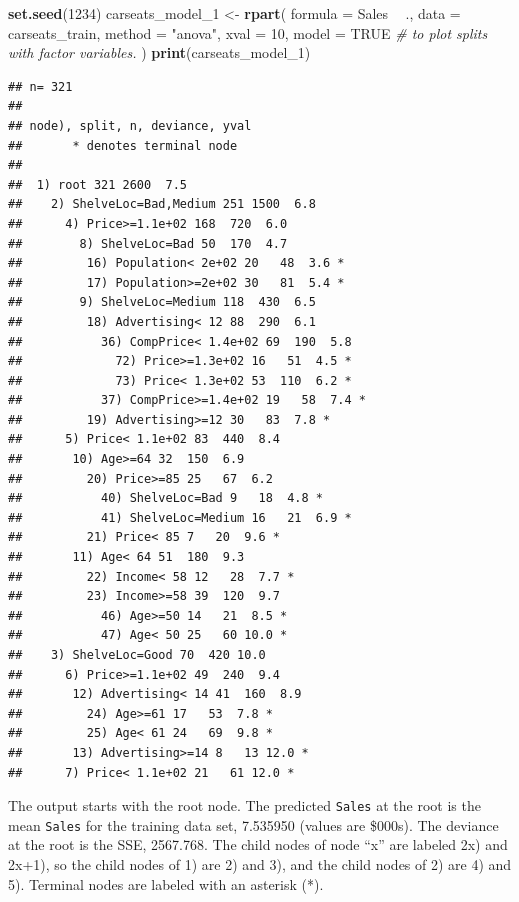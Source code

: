 \documentclass[
]{book}
\newenvironment{Shaded}{\begin{snugshade}}{\end{snugshade}}
\newcommand{\CommentTok}[1]{\textcolor[rgb]{0.56,0.35,0.01}{\textit{#1}}}
\newcommand{\DataTypeTok}[1]{\textcolor[rgb]{0.13,0.29,0.53}{#1}}
\newcommand{\DecValTok}[1]{\textcolor[rgb]{0.00,0.00,0.81}{#1}}
\newcommand{\KeywordTok}[1]{\textcolor[rgb]{0.13,0.29,0.53}{\textbf{#1}}}
\newcommand{\NormalTok}[1]{#1}
\newcommand{\OperatorTok}[1]{\textcolor[rgb]{0.81,0.36,0.00}{\textbf{#1}}}
\newcommand{\OtherTok}[1]{\textcolor[rgb]{0.56,0.35,0.01}{#1}}
\newcommand{\StringTok}[1]{\textcolor[rgb]{0.31,0.60,0.02}{#1}}
\begin{document}
\begin{Shaded}
\begin{Highlighting}[]
\KeywordTok{set.seed}\NormalTok{(}\DecValTok{1234}\NormalTok{)}
\NormalTok{carseats_model_}\DecValTok{1}\NormalTok{ <-}\StringTok{ }\KeywordTok{rpart}\NormalTok{(}
   \DataTypeTok{formula =}\NormalTok{ Sales }\OperatorTok{~}\StringTok{ }\NormalTok{.,}
   \DataTypeTok{data =}\NormalTok{ carseats_train,}
   \DataTypeTok{method =} \StringTok{"anova"}\NormalTok{, }
   \DataTypeTok{xval =} \DecValTok{10}\NormalTok{,}
   \DataTypeTok{model =} \OtherTok{TRUE}  \CommentTok{# to plot splits with factor variables.}
\NormalTok{)}
\KeywordTok{print}\NormalTok{(carseats_model_}\DecValTok{1}\NormalTok{)}
\end{Highlighting}
\end{Shaded}

\begin{verbatim}
## n= 321 
## 
## node), split, n, deviance, yval
##       * denotes terminal node
## 
##  1) root 321 2600  7.5  
##    2) ShelveLoc=Bad,Medium 251 1500  6.8  
##      4) Price>=1.1e+02 168  720  6.0  
##        8) ShelveLoc=Bad 50  170  4.7  
##         16) Population< 2e+02 20   48  3.6 *
##         17) Population>=2e+02 30   81  5.4 *
##        9) ShelveLoc=Medium 118  430  6.5  
##         18) Advertising< 12 88  290  6.1  
##           36) CompPrice< 1.4e+02 69  190  5.8  
##             72) Price>=1.3e+02 16   51  4.5 *
##             73) Price< 1.3e+02 53  110  6.2 *
##           37) CompPrice>=1.4e+02 19   58  7.4 *
##         19) Advertising>=12 30   83  7.8 *
##      5) Price< 1.1e+02 83  440  8.4  
##       10) Age>=64 32  150  6.9  
##         20) Price>=85 25   67  6.2  
##           40) ShelveLoc=Bad 9   18  4.8 *
##           41) ShelveLoc=Medium 16   21  6.9 *
##         21) Price< 85 7   20  9.6 *
##       11) Age< 64 51  180  9.3  
##         22) Income< 58 12   28  7.7 *
##         23) Income>=58 39  120  9.7  
##           46) Age>=50 14   21  8.5 *
##           47) Age< 50 25   60 10.0 *
##    3) ShelveLoc=Good 70  420 10.0  
##      6) Price>=1.1e+02 49  240  9.4  
##       12) Advertising< 14 41  160  8.9  
##         24) Age>=61 17   53  7.8 *
##         25) Age< 61 24   69  9.8 *
##       13) Advertising>=14 8   13 12.0 *
##      7) Price< 1.1e+02 21   61 12.0 *
\end{verbatim}

The output starts with the root node. The predicted \texttt{Sales} at the root is the mean \texttt{Sales} for the training data set, 7.535950 (values are \$000s). The deviance at the root is the SSE, 2567.768. The child nodes of node ``x'' are labeled 2x) and 2x+1), so the child nodes of 1) are 2) and 3), and the child nodes of 2) are 4) and 5). Terminal nodes are labeled with an asterisk (*).
\end{document}
